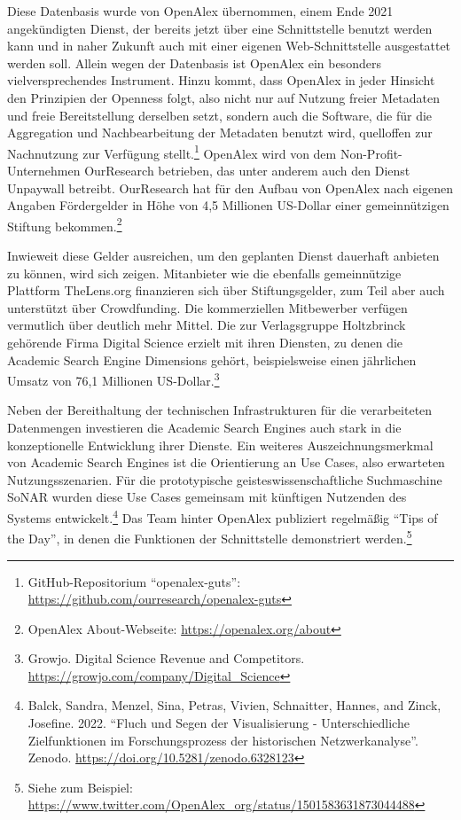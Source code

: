 \documentclass[a4paper,
fontsize=11pt,
oneside,
numbers=noperiodatend,
parskip=half-,
bibliography=totoc,
final
]{scrartcl}
\begin{document}
Diese Datenbasis wurde von OpenAlex übernommen, einem Ende 2021
angekündigten Dienst, der bereits jetzt über eine Schnittstelle benutzt
werden kann und in naher Zukunft auch mit einer eigenen
Web-Schnittstelle ausgestattet werden soll. Allein wegen der Datenbasis
ist OpenAlex ein besonders vielversprechendes Instrument. Hinzu kommt,
dass OpenAlex in jeder Hinsicht den Prinzipien der Openness folgt, also
nicht nur auf Nutzung freier Metadaten und freie Bereitstellung
derselben setzt, sondern auch die Software, die für die Aggregation und
Nachbearbeitung der Metadaten benutzt wird, quelloffen zur Nachnutzung
zur Verfügung stellt.\footnote{GitHub-Repositorium
  \enquote{openalex-guts}:
  \url{https://github.com/ourresearch/openalex-guts}} OpenAlex wird von
dem Non-Profit-Unternehmen OurResearch betrieben, das unter anderem auch
den Dienst Unpaywall betreibt. OurResearch hat für den Aufbau von
OpenAlex nach eigenen Angaben Fördergelder in Höhe von 4,5 Millionen
US-Dollar einer gemeinnützigen Stiftung bekommen.\footnote{OpenAlex
  About-Webseite: \url{https://openalex.org/about}}

Inwieweit diese Gelder ausreichen, um den geplanten Dienst dauerhaft
anbieten zu können, wird sich zeigen. Mitanbieter wie die ebenfalls
gemeinnützige Plattform TheLens.org finanzieren sich über
Stiftungsgelder, zum Teil aber auch unterstützt über Crowdfunding. Die
kommerziellen Mitbewerber verfügen vermutlich über deutlich mehr Mittel.
Die zur Verlagsgruppe Holtzbrinck gehörende Firma Digital Science
erzielt mit ihren Diensten, zu denen die Academic Search Engine
Dimensions gehört, beispielsweise einen jährlichen Umsatz von 76,1
Millionen US-Dollar.\footnote{Growjo. Digital Science Revenue and
  Competitors. \url{https://growjo.com/company/Digital_Science}}

Neben der Bereithaltung der technischen Infrastrukturen für die
verarbeiteten Datenmengen investieren die Academic Search Engines auch
stark in die konzeptionelle Entwicklung ihrer Dienste. Ein weiteres
Auszeichnungsmerkmal von Academic Search Engines ist die Orientierung an
Use Cases, also erwarteten Nutzungsszenarien. Für die prototypische
geisteswissenschaftliche Suchmaschine SoNAR wurden diese Use Cases
gemeinsam mit künftigen Nutzenden des Systems entwickelt.\footnote{Balck,
  Sandra, Menzel, Sina, Petras, Vivien, Schnaitter, Hannes, and Zinck,
  Josefine. 2022. \enquote{Fluch und Segen der Visualisierung -
  Unterschiedliche Zielfunktionen im Forschungsprozess der historischen
  Netzwerkanalyse}. Zenodo. \url{https://doi.org/10.5281/zenodo.6328123}}
Das Team hinter OpenAlex publiziert regelmäßig \enquote{Tips of the
Day}, in denen die Funktionen der Schnittstelle demonstriert
werden.\footnote{Siehe zum Beispiel:
  \url{https://www.twitter.com/OpenAlex_org/status/1501583631873044488}}
\end{document}
